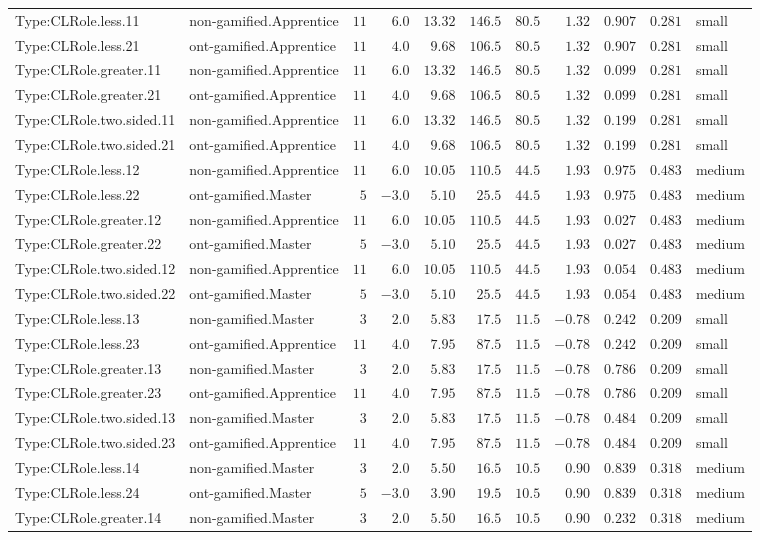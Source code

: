 \documentclass[6pt,a4paper]{article}
\begin{document}
{\begin{longtable}{llrrrrrrrrl}
Type:CLRole.less.11&non-gamified.Apprentice&$11$&$ 6.0$&$13.32$&$146.5$&$ 80.5$&$ 1.32$&$0.907$&$0.281$&small\tabularnewline
Type:CLRole.less.21&ont-gamified.Apprentice&$11$&$ 4.0$&$ 9.68$&$106.5$&$ 80.5$&$ 1.32$&$0.907$&$0.281$&small\tabularnewline
Type:CLRole.greater.11&non-gamified.Apprentice&$11$&$ 6.0$&$13.32$&$146.5$&$ 80.5$&$ 1.32$&$0.099$&$0.281$&small\tabularnewline
Type:CLRole.greater.21&ont-gamified.Apprentice&$11$&$ 4.0$&$ 9.68$&$106.5$&$ 80.5$&$ 1.32$&$0.099$&$0.281$&small\tabularnewline
Type:CLRole.two.sided.11&non-gamified.Apprentice&$11$&$ 6.0$&$13.32$&$146.5$&$ 80.5$&$ 1.32$&$0.199$&$0.281$&small\tabularnewline
Type:CLRole.two.sided.21&ont-gamified.Apprentice&$11$&$ 4.0$&$ 9.68$&$106.5$&$ 80.5$&$ 1.32$&$0.199$&$0.281$&small\tabularnewline
Type:CLRole.less.12&non-gamified.Apprentice&$11$&$ 6.0$&$10.05$&$110.5$&$ 44.5$&$ 1.93$&$0.975$&$0.483$&medium\tabularnewline
Type:CLRole.less.22&ont-gamified.Master&$ 5$&$-3.0$&$ 5.10$&$ 25.5$&$ 44.5$&$ 1.93$&$0.975$&$0.483$&medium\tabularnewline
Type:CLRole.greater.12&non-gamified.Apprentice&$11$&$ 6.0$&$10.05$&$110.5$&$ 44.5$&$ 1.93$&$0.027$&$0.483$&medium\tabularnewline
Type:CLRole.greater.22&ont-gamified.Master&$ 5$&$-3.0$&$ 5.10$&$ 25.5$&$ 44.5$&$ 1.93$&$0.027$&$0.483$&medium\tabularnewline
Type:CLRole.two.sided.12&non-gamified.Apprentice&$11$&$ 6.0$&$10.05$&$110.5$&$ 44.5$&$ 1.93$&$0.054$&$0.483$&medium\tabularnewline
Type:CLRole.two.sided.22&ont-gamified.Master&$ 5$&$-3.0$&$ 5.10$&$ 25.5$&$ 44.5$&$ 1.93$&$0.054$&$0.483$&medium\tabularnewline
Type:CLRole.less.13&non-gamified.Master&$ 3$&$ 2.0$&$ 5.83$&$ 17.5$&$ 11.5$&$-0.78$&$0.242$&$0.209$&small\tabularnewline
Type:CLRole.less.23&ont-gamified.Apprentice&$11$&$ 4.0$&$ 7.95$&$ 87.5$&$ 11.5$&$-0.78$&$0.242$&$0.209$&small\tabularnewline
Type:CLRole.greater.13&non-gamified.Master&$ 3$&$ 2.0$&$ 5.83$&$ 17.5$&$ 11.5$&$-0.78$&$0.786$&$0.209$&small\tabularnewline
Type:CLRole.greater.23&ont-gamified.Apprentice&$11$&$ 4.0$&$ 7.95$&$ 87.5$&$ 11.5$&$-0.78$&$0.786$&$0.209$&small\tabularnewline
Type:CLRole.two.sided.13&non-gamified.Master&$ 3$&$ 2.0$&$ 5.83$&$ 17.5$&$ 11.5$&$-0.78$&$0.484$&$0.209$&small\tabularnewline
Type:CLRole.two.sided.23&ont-gamified.Apprentice&$11$&$ 4.0$&$ 7.95$&$ 87.5$&$ 11.5$&$-0.78$&$0.484$&$0.209$&small\tabularnewline
Type:CLRole.less.14&non-gamified.Master&$ 3$&$ 2.0$&$ 5.50$&$ 16.5$&$ 10.5$&$ 0.90$&$0.839$&$0.318$&medium\tabularnewline
Type:CLRole.less.24&ont-gamified.Master&$ 5$&$-3.0$&$ 3.90$&$ 19.5$&$ 10.5$&$ 0.90$&$0.839$&$0.318$&medium\tabularnewline
Type:CLRole.greater.14&non-gamified.Master&$ 3$&$ 2.0$&$ 5.50$&$ 16.5$&$ 10.5$&$ 0.90$&$0.232$&$0.318$&medium\tabularnewline

\end{longtable}}
\end{document}
